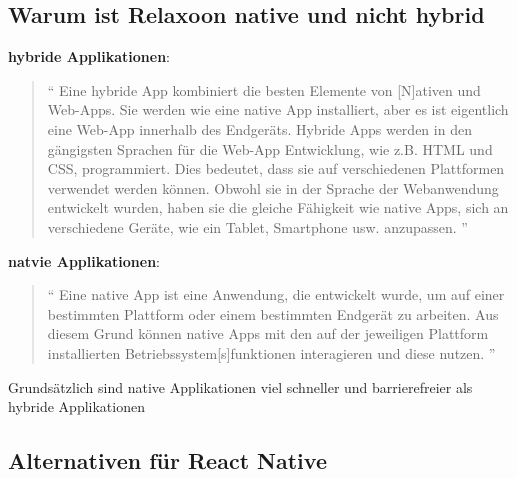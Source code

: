 \begin{spacing}{1}
    \subsection{Warum ist Relaxoon native und nicht hybrid}

    \textbf{hybride Applikationen}: \begin{quotation}
        ``
        Eine hybride App kombiniert die besten Elemente von [N]ativen und Web-Apps.
        Sie werden wie eine native App installiert, aber es ist eigentlich
        eine Web-App innerhalb des Endgeräts.
        Hybride Apps werden in den gängigsten Sprachen für die Web-App Entwicklung, wie z.B. HTML und CSS, programmiert. Dies bedeutet, dass sie auf verschiedenen Plattformen verwendet werden können.
        Obwohl sie in der Sprache der Webanwendung entwickelt wurden, haben sie die gleiche Fähigkeit wie native Apps, sich an verschiedene Geräte, wie ein Tablet, Smartphone usw. anzupassen.
        ''
        \cite{native-vs-hybrid}
    \end{quotation}
    \textbf{natvie Applikationen}: \begin{quotation}
        ``
        Eine native App ist eine Anwendung, die entwickelt wurde,
        um auf einer bestimmten Plattform oder einem bestimmten Endgerät zu arbeiten.
        Aus diesem Grund können native Apps mit den auf der jeweiligen Plattform
        installierten Betriebssystem[s]funktionen interagieren und diese nutzen.
        ''

        \cite{native-vs-hybrid}

    \end{quotation}

    Grundsätzlich sind native Applikationen  viel schneller und barrierefreier als hybride Applikationen
    \cite{native-vs-hybrid}



    \subsection{Alternativen für React Native}


\end{spacing}
